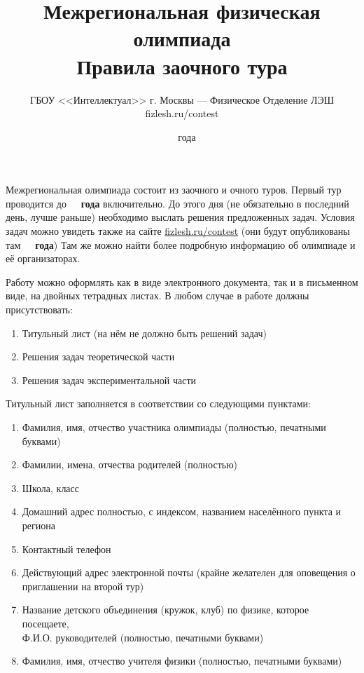 \documentclass[a4paper,12pt]{article}
\title{\bf Межрегиональная физическая олимпиада\\Правила заочного тура}
\author{ГБОУ <<Интеллектуал>> г. Москвы --- Физическое Отделение ЛЭШ\\
fizlesh.ru/contest}
\date{\olympdatestart~\olympyearstart~года}
\begin{document}
\maketitle
\thispagestyle{empty}

Межрегиональная олимпиада состоит из заочного и очного туров. Первый тур проводится
до \textbf{\olympdateend~\olympyearend~года} включительно.
До этого дня (не обязательно в последний день, лучше раньше) необходимо выслать решения предложенных задач.
Условия задач можно увидеть также на сайте \href{http://fizlesh.ru/contest}{fizlesh.ru/contest}
(они будут опубликованы там \textbf{\olympdatestart~\olympyearstart~года})
Там же можно найти более подробную информацию об олимпиаде и её организаторах.

\bigskip

Работу можно оформлять как в виде электронного документа, так и в письменном виде, на двойных тетрадных листах.
В любом случае в работе должны присутствовать:
\begin{enumerate}
\setlength{\itemsep}{-3pt}
\item Титульный лист (на нём не должно быть решений задач)
\item Решения задач теоретической части
\item Решения задач экспериментальной части
\end{enumerate}

Титульный лист заполняется в соответствии со следующими пунктами:
\begin{enumerate}
\setlength{\itemsep}{-3pt}
\item Фамилия, имя, отчество участника олимпиады (полностью, печатными буквами)
\item Фамилии, имена, отчества родителей (полностью)
\item Школа, класс
\item Домашний адрес полностью, с индексом, названием населённого пункта и региона
\item Контактный телефон
\item Действующий адрес электронной почты (крайне желателен для оповещения о приглашении на второй тур)
\item Название детского объединения (кружок, клуб) по физике, которое посещаете,\\
Ф.И.О. руководителей (полностью, печатными буквами)
\item Фамилия, имя, отчество учителя физики (полностью, печатными буквами)
\end{enumerate}
\end{document}
